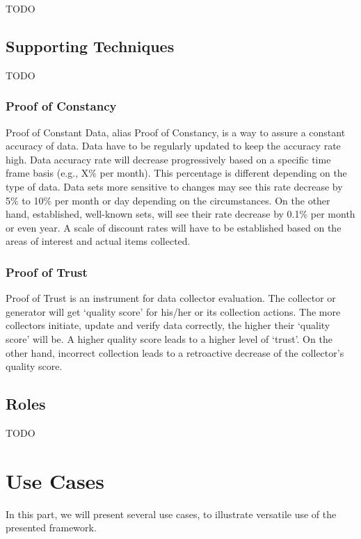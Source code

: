 TODO

\subsection{Supporting Techniques}

TODO

\subsubsection{Proof of Constancy}

Proof of Constant Data, alias Proof of Constancy, is a way to assure a constant accuracy of data.
Data have to be regularly updated to keep the accuracy rate high.
Data accuracy rate will decrease progressively based on a specific time frame basis (e.g., X\% per month).
This percentage is different depending on the type of data.
Data sets more sensitive to changes may see this rate decrease by 5\% to 10\% per month or day depending on the circumstances.
On the other hand, established, well-known sets, will see their rate decrease by 0.1\% per month or even year.
A scale of discount rates will have to be established based on the areas of interest and actual items collected.

\subsubsection{Proof of Trust}

Proof of Trust is an instrument for data collector evaluation.
The collector or generator will get \enquote*{quality score} for his/her or its collection actions.
The more collectors initiate, update and verify data correctly, the higher their \enquote*{quality score} will be.
A higher quality score leads to a higher level of \enquote*{trust}.
On the other hand, incorrect collection leads to a retroactive decrease of the collector's quality score.

\subsection{Roles}

TODO

\section{Use Cases}

In this part, we will present several use cases, to illustrate versatile use of the presented framework.

